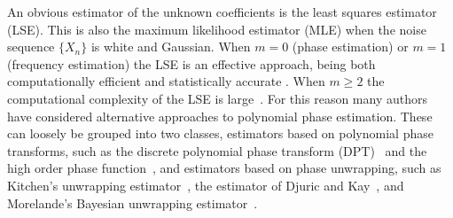 \documentclass[journal]{IEEEtran}
\begin{document}
%

An obvious estimator of the unknown coefficients is the least squares estimator (LSE).  This is also the maximum likelihood estimator (MLE) when the noise sequence $\{X_n\}$ is white and Gaussian.  When $m=0$ (phase estimation) or $m=1$ (frequency estimation) the LSE is an effective approach, being both computationally efficient and statistically accurate \cite{Quinn2009_dasp_phase_only_information_loss,Hannan1973,Quinn2001,McKilliam_mean_dir_est_sq_arc_length2010}\cite[Sec.~6.4~and~9.1]{McKilliam2010thesis}. When $m \geq 2$ the computational complexity of the LSE is large~\cite[Sec.~10.1]{McKilliam2010thesis}\cite{Abatzoglou_ml_chirp_1986}. For this reason many authors have considered alternative approaches to polynomial phase estimation. These can loosely be grouped into two classes, estimators based on polynomial phase transforms, such as the discrete polynomial phase transform (DPT)~\cite{Peleg_DPT_1995,Peleg1991_est_class_PPS_1991,Porat_asympt_HAF_DPT_1996} and the high order phase function~\cite{Farquharson_another_poly_est_2005}, and estimators based on phase unwrapping, such as Kitchen's unwrapping estimator~\cite{Kitchen_polyphase_unwrapping_1994}, the estimator of Djuric and Kay~\cite{Djuric_phase_unwrap_chirp_1990}, and Morelande's Bayesian unwrapping estimator~\cite{Morelande_bayes_unwrapping_2009_tsp}.
\end{document}
